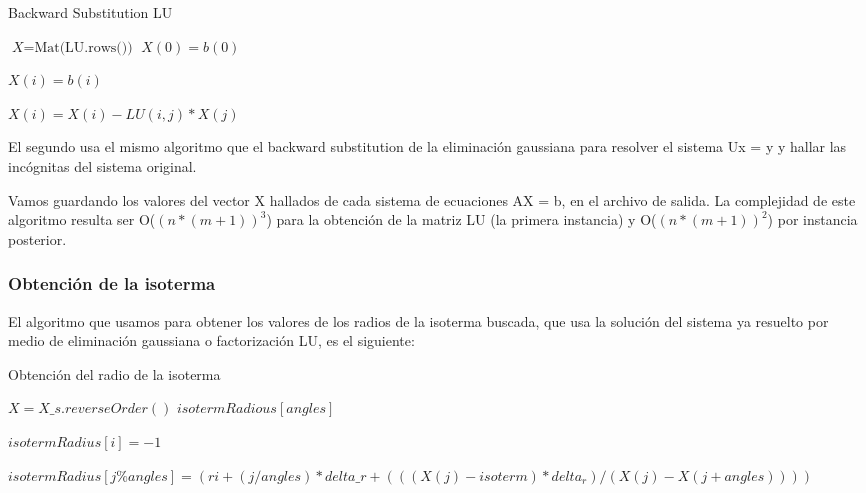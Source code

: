\begin{algorithm}
\caption{Backward Substitution LU}\label{euclid}
\begin{algorithmic}[1]


    \State $\textit{X} = \text{Mat(LU.rows())}$
    \State $X(0) = b(0)$

      \State $X(i) = b(i)$

        \State $X(i) = X(i) - LU(i,j)*X(j)$
      \EndFor

    \EndFor
      
  \EndFunction

\end{algorithmic}
\end{algorithm}

El segundo usa el mismo algoritmo que el backward substitution de la eliminación gaussiana para resolver el sistema Ux = y y hallar las incógnitas del sistema original. 

Vamos guardando los valores del vector X hallados de cada sistema de ecuaciones AX = b, en el archivo de salida. La complejidad de este algoritmo resulta ser O($(n*(m+1))^{3}$) para la obtención de la matriz LU (la primera instancia) y O($(n*(m+1))^{2}$)
por instancia posterior.


\subsubsection{Obtención de la isoterma}

El algoritmo que usamos para obtener los valores de los radios de la isoterma buscada, que usa la solución del sistema ya resuelto por medio de eliminación gaussiana o factorización LU, es el siguiente:

\begin{algorithm}
\caption{Obtención del radio de la isoterma}\label{euclid}
\begin{algorithmic}[1]


    \State $X = X\_s.reverseOrder()$
    \State $isotermRadious[angles]$

      \State $isotermRadius[i] = -1$
    \EndFor

       \State $isotermRadius[j \% angles] = (ri + (j / angles)*delta\_r + (((X(j) - isoterm) * delta_r)/ (X(j) - X(j+angles)) ))$
      \EndIf
    \EndFor

  \EndFunction

\end{algorithmic}
\end{algorithm}


